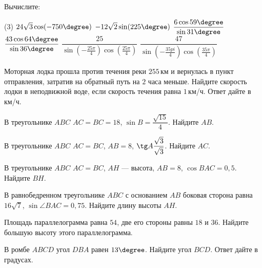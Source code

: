 \begin{homework}[number=1]
	\begin{listofex}
		\item Вычислите:
		\begin{tasks}(3)
			\task \( 24\sqrt{3}\cos(-750\degree) \)
			\task \( -12\sqrt{2}\sin(225\degree) \)
			\task \( \dfrac{6\cos59\degree}{\sin31\degree} \)
			\task \( \dfrac{43\cos64\degree}{\sin36\degree} \)
			\task \( \dfrac{25}{\sin\left( -\frac{25\pi}{4} \right)\cos\left( \frac{25\pi}{4} \right)} \)
			\task \( \dfrac{47}{\sin\left( -\frac{35pi}{4} \right)\cos\left( \frac{35\pi}{4} \right)} \)
		\end{tasks}
		\item Моторная лодка прошла против течения реки \( 255 \) км и вернулась в пункт отправления, затратив на обратный путь на \( 2 \) часа меньше. Найдите скорость лодки в неподвижной воде, если скорость течения равна \( 1 \) км/ч. Ответ дайте в км/ч.
		\item В треугольнике \( ABC \) \( AC=BC=18 \), \( \sin B=\dfrac{\sqrt{15}}{4} \). Найдите \( AB \).
		\item В треугольнике \( ABC \) \( AC=BC \), \( AB=8 \), \( \tg A\dfrac{\sqrt{3}}{\sqrt{3}} \).  Найдите \( AC \).
		\item В треугольнике \( ABC \) \( AC=BC \), \( AH \) --- высота, \( AB=8 \), \( \cos BAC=0,5 \). Найдите \( BH \).
		\item В равнобедренном треугольнике \( ABC \) с основанием \( AB \) боковая сторона равна \( 16\sqrt{7} \), \( \sin\angle BAC=0,75 \). Найдите длину высоты \( AH \).
		\item Площадь параллелограмма равна \( 54 \), две его стороны равны \( 18 \) и \( 36 \). Найдите большую высоту этого параллелограмма.
		\item В ромбе \( ABCD \) угол \( DBA \) равен \( 13\degree \). Найдите угол \( BCD \). Ответ дайте в градусах.
	\end{listofex}
\end{homework}

